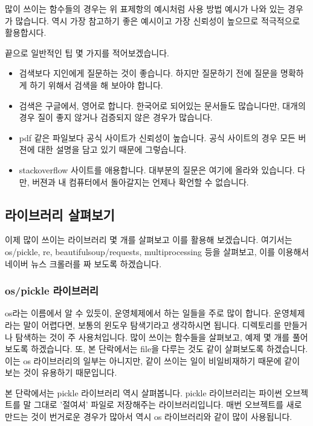 \documentclass[twoside]{article}
\begin{document}
많이 쓰이는 함수들의 경우는 위 표제항의 예시처럼 사용 방법 예시가 나와 있는 경우가 많습니다. 역시 가장 참고하기 좋은 예시이고 가장 신뢰성이 높으므로 적극적으로 활용합시다. 

끝으로 일반적인 팁 몇 가지를 적어보겠습니다. 

\begin{itemize}
\item 검색보다 지인에게 질문하는 것이 좋습니다. 하지만 질문하기 전에 질문을 명확하게 하기 위해서 검색을 해 보아야 합니다. 
\item 검색은 구글에서, 영어로 합니다. 한국어로 되어있는 문서들도 많습니다만, 대개의 경우 질이 좋지 않거나 검증되지 않은 경우가 많습니다. 
\item pdf 같은 파일보다 공식 사이트가 신뢰성이 높습니다. 공식 사이트의 경우 모든 버젼에 대한 설명을 담고 있기 때문에 그렇습니다. 
\item stackoverflow 사이트를 애용합니다. 대부분의 질문은 여기에 올라와 있습니다. 다만, 버젼과 내 컴퓨터에서 돌아갈지는 언제나 확언할 수 없습니다. 
\end{itemize}



\subsection{라이브러리 살펴보기}

이제 많이 쓰이는 라이브러리 몇 개를 살펴보고 이를 활용해 보겠습니다. 여기서는 os/pickle, re, beautifulsoup/requests, multiprocessing 등을 살펴보고, 이를 이용해서 네이버 뉴스 크롤러를 짜 보도록 하겠습니다. 

\subsubsection{os/pickle 라이브러리}

os라는 이름에서 알 수 있듯이, 운영체제에서 하는 일들을 주로 많이 합니다. 운영체제라는 말이 어렵다면, 보통의 윈도우 탐색기라고 생각하시면 됩니다. 디렉토리를 만들거나 탐색하는 것이 주 사용처입니다. 많이 쓰이는 함수들을 살펴보고, 예제 몇 개를 풀어보도록 하겠습니다. 또, 본 단락에서는 file을 다루는 것도 같이 살펴보도록 하겠습니다. 이는 os 라이브러리의 일부는 아니지만, 같이 쓰이는 일이 비일비재하기 때문에 같이 보는 것이 유용하기 때문입니다. 

본 단락에서는 pickle 라이브러리 역시 살펴봅니다. pickle 라이브러리는 파이썬 오브젝트를 말 그대로 '절여셔' 파일로 저장해주는 라이브러리입니다. 매번 오브젝트를 새로 만드는 것이 번거로운 경우가 많아서 역시 os 라이브러리와 같이 많이 사용됩니다. 
\end{document}
